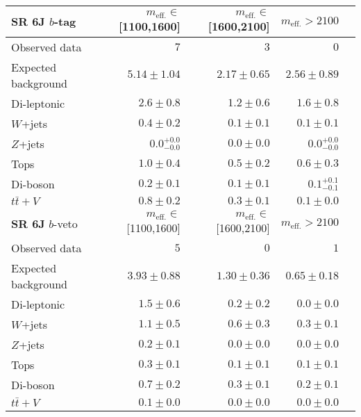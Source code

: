 \begin{tabular*}{\textwidth}{@{\extracolsep{\fill}}lrrrr}
\toprule
\textbf{SR 6J} $b$-tag &  $m_{\mathrm{eff.}}\in$[1100,1600] & $m_{\mathrm{eff.}}\in$[1600,2100] & $m_{\mathrm{eff.}}>2100$ \\
\midrule

Observed data          & $7$              & $3$              & $0$                    \\
\midrule
Expected background         & $5.14 \pm 1.04$          & $2.17 \pm 0.65$          & $2.56 \pm 0.89$              \\
\midrule
        Di-leptonic         & $2.6 \pm 0.8$          & $1.2 \pm 0.6$          & $1.6 \pm 0.8$              \\
        $W$+jets         & $0.4 \pm 0.2$          & $0.1 \pm 0.1$          & $0.1 \pm 0.1$              \\
        $Z$+jets         & $0.0_{-0.0}^{+0.0}$          & $0.0 \pm 0.0$          & $0.0_{-0.0}^{+0.0}$              \\
        Tops         & $1.0 \pm 0.4$          & $0.5 \pm 0.2$          & $0.6 \pm 0.3$              \\
        Di-boson         & $0.2 \pm 0.1$          & $0.1 \pm 0.1$          & $0.1_{-0.1}^{+0.1}$              \\
        $t\bar{t}+V$         & $0.8 \pm 0.2$          & $0.3 \pm 0.1$          & $0.1 \pm 0.0$              \\
\toprule
\textbf{SR 6J} $b$-veto &  $m_{\mathrm{eff.}}\in$[1100,1600] & $m_{\mathrm{eff.}}\in$[1600,2100] & $m_{\mathrm{eff.}}>2100$ \\
\midrule
Observed data          & $5$              & $0$              & $1$                    \\
\midrule
Expected background         & $3.93 \pm 0.88$          & $1.30 \pm 0.36$          & $0.65 \pm 0.18$              \\
\midrule
        Di-leptonic         & $1.5 \pm 0.6$          & $0.2 \pm 0.2$          & $0.0 \pm 0.0$              \\
        $W$+jets         & $1.1 \pm 0.5$          & $0.6 \pm 0.3$          & $0.3 \pm 0.1$              \\
        $Z$+jets         & $0.2 \pm 0.1$          & $0.0 \pm 0.0$          & $0.0 \pm 0.0$              \\
        Tops         & $0.3 \pm 0.1$          & $0.1 \pm 0.1$          & $0.1 \pm 0.1$              \\
        Di-boson         & $0.7 \pm 0.2$          & $0.3 \pm 0.1$          & $0.2 \pm 0.1$              \\
        $t\bar{t}+V$         & $0.1 \pm 0.0$          & $0.0 \pm 0.0$          & $0.0 \pm 0.0$              \\


\bottomrule
\end{tabular*}




